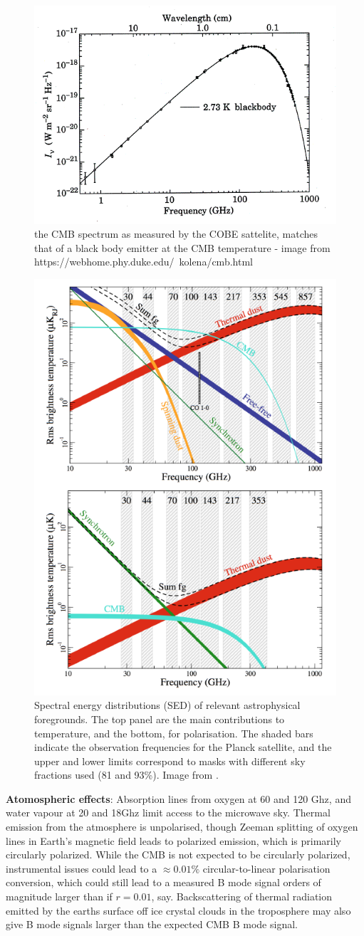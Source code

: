 \documentclass[a4paper,10pt]{article}
\begin{document}
\begin{figure}[h]
  \includegraphics[width=0.4\linewidth]{cmbspectrum1.png}
  \centering
  \caption{the CMB spectrum as measured by the COBE sattelite, matches that of a black body emitter at the CMB temperature - image from https://webhome.phy.duke.edu/~kolena/cmb.html  }
\end{figure}

\begin{figure}[h]
\includegraphics[width=0.4\linewidth]{foregrounds.png}
\centering
\caption{Spectral energy distributions (SED) of relevant astrophysical foregrounds. The top panel are the main contributions to temperature, and the bottom, for polarisation. The shaded bars indicate the observation frequencies for the Planck satellite, and the upper and lower limits correspond to masks with different sky fractions used (81 and 93\%). Image from \cite{planck2016b}.}
\label{foregrounds}
\end{figure}

\textbf{Atomospheric effects}: Absorption lines from oxygen at 60 and 120 Ghz, and water vapour at 20 and 18Ghz limit access to the microwave sky. Thermal emission from the atmosphere is unpolarised, though Zeeman splitting of oxygen lines in Earth's magnetic field leads to polarized emission, which is primarily circularly polarized. While the CMB is not expected to be circularly polarized, instrumental issues could lead to a $\approx 0.01\%$ circular-to-linear polarisation conversion, which could still lead to a measured B mode signal orders of magnitude larger than if $r=0.01$, say. Backscattering of thermal radiation emitted by the earths surface off ice  crystal clouds in the troposphere may also give B mode signals larger than the expected CMB B mode signal. \\
\end{document}
